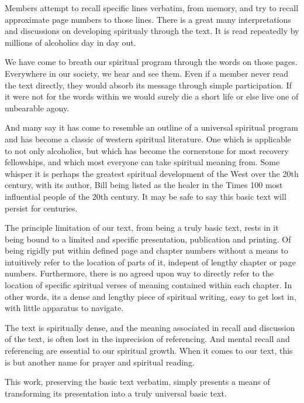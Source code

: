 \begin{fmatterchapter}
Members attempt to recall specific lines verbatim, from memory, 
    and try to recall approximate page numbers to those lines.
There is a great many interpretations and discussions 
    on developing spiritualy through the text.
It is read repeatedly by millions of alcoholics day in day out.

We have come to breath our spiritual program 
    through the words on those pages.
Everywhere in our society, we hear and see them.
Even if a member never read the text directly, 
    they would absorb its message through simple participation.
If it were not for the words within 
    we would surely die a short life 
    or else live one of unbearable agony.

And many say it has come to resemble an outline 
    of a universal spiritual program 
    and has become a classic of western spiritual literature.
One which is applicable to not only alcoholics, 
    but which has become the cornerstone for most recovery fellowships,
    and which most everyone can take spiritual meaning from.
Some whisper it is perhaps the greatest spiritual development of the West over the 20th century, with its author, Bill being listed as the healer in the Times 100 most influential people of the 20th century.
It may be safe to say this basic text will persist for centuries.

The principle limitation of our text, from being a truly basic text, 
    rests in it being bound to a limited and specific 
    presentation, publication and printing.
Of being rigidly put within defined page and chapter numbers 
    without a means to intuitively refer to the location of parts of it, 
    indepent of lengthy chapter or page numbers.
Furthermore, there is no agreed upon way to directly refer 
    to the location of specific spiritual verses of meaning 
    contained within each chapter.
In other words, its a dense and lengthy piece of spiritual writing, 
    easy to get lost in, 
    with little apparatus to navigate.

The text is spiritually dense, 
    and the meaning associated in recall and discussion of the text, 
    is often lost in the inprecision of referencing.
And mental recall and referencing are essential to our spiritual growth.
When it comes to our text, this is but another name for prayer and spiritual reading.

This work, preserving the basic text verbatim, 
    simply presents a means of transforming its presentation 
    into a truly universal basic text.


\end{fmatterchapter}

